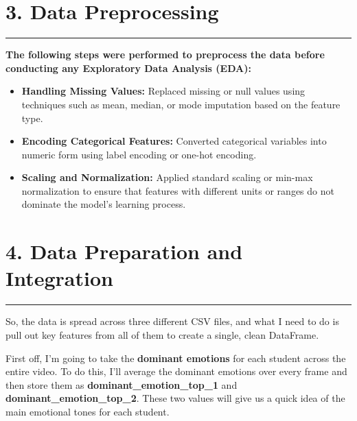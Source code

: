\documentclass{article}
\newcommand{\highlight}[1]{\textsf{\textbf{#1}}}  %
\begin{document}
\section{3. Data Preprocessing}
  \begin{center}
        \color{red}\rule{1\linewidth}{1mm}
    \end{center}
    
\begin{tcolorbox}[colback=teal!5!white,colframe=teal!75!black,title= Steps for Data preprocessing]
\textbf{The following steps were performed to preprocess the data before conducting any Exploratory Data Analysis (EDA):}

\begin{itemize}
    \item \textbf{Handling Missing Values:} Replaced missing or null values using techniques such as mean, median, or mode imputation based on the feature type.
    \item \textbf{Encoding Categorical Features:} Converted categorical variables into numeric form using label encoding or one-hot encoding.
    \item \textbf{Scaling and Normalization:} Applied standard scaling or min-max normalization to ensure that features with different units or ranges do not dominate the model's learning process.
\end{itemize}
\end{tcolorbox}



\section{4. Data Preparation and Integration}

  \begin{center}
        \color{red}\rule{1\linewidth}{1mm}
    \end{center}
    
So, the data is spread across three different CSV files, and what I need to do is pull out key features from all of them to create a single, clean DataFrame.

\noindent\sffamily
First off, I’m going to take the \highlight{dominant emotions} for each student across the entire video. To do this, I’ll average the dominant emotions over every frame and then store them as \highlight{dominant\_emotion\_top\_1} and \highlight{dominant\_emotion\_top\_2}. These two values will give us a quick idea of the main emotional tones for each student.
\end{document}

